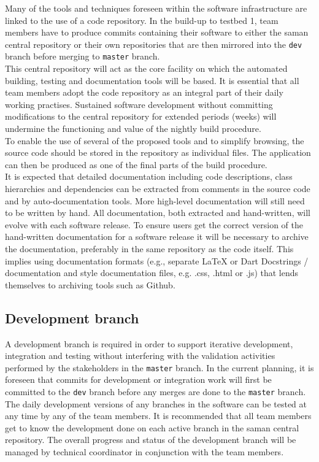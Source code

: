\noindent Many of the tools and techniques foreseen within the software infrastructure are linked to the use of a code repository. In the build-up to testbed 1, team members have to produce commits containing their software to either the saman central repository or their own repositories that are then mirrored into the \texttt{dev} branch before merging to \texttt{master} branch.\\

\noindent This central repository will act as the core facility on which the automated building, testing and documentation tools will be based. It is essential that all team members adopt the code repository as an integral part of their daily working practises. Sustained software development without committing modifications to the central repository for extended periods (weeks) will undermine the functioning and value of the nightly build procedure.\\

\noindent To enable the use of several of the proposed tools and to simplify browsing, the source code should be stored in the repository as individual files. The application can then be produced as one of the final parts of the build procedure.\\

\noindent It is expected that detailed documentation including code descriptions, class hierarchies and dependencies can be extracted from comments in the source code and by auto-documentation tools. More high-level documentation will still need to be written by hand. All documentation, both extracted and hand-written, will evolve with each software release. To ensure users get the correct version of the hand-written documentation for a software release it will be necessary to archive the documentation, preferably in the same repository as the code itself. This implies using documentation formats (e.g., separate \LaTeX\: or Dart Docstrings / documentation and style documentation files, e.g. .css, .html or .js) that lends themselves to archiving tools such as Github.  

\subsection{Development branch}

A development branch is required in order to support iterative development, integration and testing without interfering with the validation activities performed by the stakeholders in the \texttt{master} branch. In the current planning, it is foreseen that commits for development or integration work will first be committed to the \texttt{dev} branch before any merges are done to the \texttt{master} branch. The daily development versions of any branches in the software can be tested at any time by any of the team members. It is recommended that all team members get to know the development done on each active branch in the saman central repository. The overall progress and status of the development branch will be managed by technical coordinator in conjunction with the team members.\\

